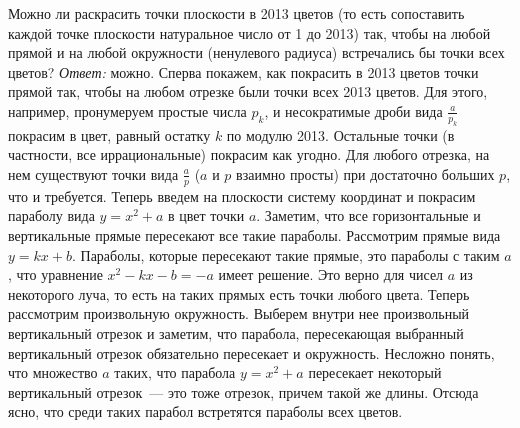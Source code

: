 \problem{}
Можно ли раскрасить точки плоскости в 2013 цветов
(то есть сопоставить каждой точке плоскости натуральное число от 1 до 2013)
так, чтобы на любой прямой и на любой окружности (ненулевого радиуса)
встречались бы точки всех цветов?
\solution
\emph{Ответ:} можно.
Сперва покажем, как покрасить в 2013 цветов точки прямой так, чтобы на любом
отрезке были точки всех 2013 цветов.
Для этого, например, пронумеруем простые числа $p_k$, и несократимые дроби вида
$\frac{a}{p_k}$ покрасим в цвет,
равный остатку $k$ по модулю 2013.
Остальные точки (в частности, все иррациональные) покрасим как угодно.
Для любого отрезка, на нем существуют точки вида $\frac{a}{p}$
($a$ и $p$ взаимно просты) при достаточно больших $p$, что и требуется.
Теперь введем на плоскости систему координат и покрасим параболу вида
$y = x^2 + a$ в цвет точки $a$.
Заметим, что все горизонтальные и вертикальные прямые пересекают все такие
параболы.
Рассмотрим прямые вида $y = k x + b$.
Параболы, которые пересекают такие прямые, это параболы с таким $a$, что
уравнение $x^2 - k x - b = -a$ имеет решение.
Это верно для чисел $a$ из некоторого луча, то есть на таких прямых есть точки
любого цвета.
Теперь рассмотрим произвольную окружность.
Выберем внутри нее произвольный вертикальный отрезок и заметим, что парабола,
пересекающая выбранный вертикальный отрезок обязательно пересекает и
окружность.
Несложно понять, что множество $a$ таких, что парабола $y = x^2 + a$ пересекает
некоторый вертикальный отрезок~--- это тоже отрезок, причем такой же длины.
Отсюда ясно, что среди таких парабол встретятся параболы всех цветов.
\endproblem
